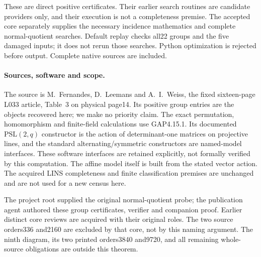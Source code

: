 \documentclass[11pt]{article}
\begin{document}
These are direct positive certificates. Their earlier search routines are
candidate providers only, and their execution is not a completeness premise.
The accepted core separately supplies the necessary incidence mathematics
and complete normal-quotient searches. Default replay checks all22 groups
and the five damaged inputs; it does not rerun those searches. Python
optimization is rejected before output. Complete native sources are included.

\paragraph{Sources, software and scope.}
The source is M.~Fernandes, D.~Leemans and A.~I.~Weiss, the fixed sixteen-page
L033 article, Table~3 on physical page14. Its positive group entries are the
objects recovered here; we make no priority claim. The exact permutation,
homomorphism and finite-field calculations use GAP4.15.1. Its documented
$\mathrm{PSL}(2,q)$ constructor is the action of determinant-one matrices
on projective lines, and the standard alternating/symmetric constructors
are named-model interfaces. These software interfaces are retained explicitly,
not formally verified by this computation. The affine model itself is built
from the stated vector action. The acquired LINS completeness and finite
classification premises are unchanged and are not used for a new census here.

The project root supplied the original normal-quotient probe; the publication
agent authored these group certificates, verifier and companion proof.
Earlier distinct core reviews are acquired with their original roles.
The two source orders336 and2160 are excluded by that core, not by this
naming argument. The ninth diagram, its two printed orders3840 and9720,
and all remaining whole-source obligations are outside this theorem.
\end{document}
